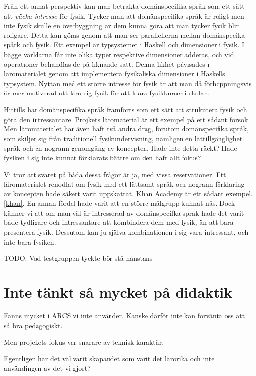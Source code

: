 \begin{binge}
Från ett annat perspektiv kan man betrakta domänspecifika språk som ett sätt att \textit{väcka intresse} för fysik. Tycker man att domänspecifika språk är roligt men inte fysik skulle en överbyggning av dem kunna göra att man tycker fysik blir roligare. Detta kan göras genom att man ser parallellerna mellan domänspecika spårk och fysik. Ett exempel är typsystemet i Haskell och dimensioner i fysik. I bägge världarna får inte olika typer respektive dimensioner adderas, och vid operationer behandlas de på liknande sätt. Denna likhet påvisades i läromaterialet genom att implementera fysikaliska dimensioner i Haskells typsystem. Nyttan med ett större intresse för fysik är att man då förhoppningsvis är mer motiverad att lära sig fysik för att klara fysikkurser i skolan.

Hittills har domänspecifika språk framförts som ett sätt att strukutera fysik och göra den intressantare. Projkets läromaterial är ett exempel på ett sådant försök. Men läromaterialet har även haft två andra drag, förutom domänspecifika språk, som skiljer sig från traditionell fysikundervisning, nämligen en lättillgänglighet språk och en nogrann genomgång av koncepten. Hade inte detta räckt? Hade fysiken i sig inte kunnat förklarats bättre om den haft allt fokus?

Vi tror att svaret på båda dessa frågor är ja, med vissa reservationer. Ett läromaterialet renodlat om fysik med ett lättsamt språk och nogrann förklaring av koncepten hade säkert varit uppskattat. Khan Academy är ett sådant exempel.\ref{khan}. En annan fördel hade varit att en större målgrupp kunnat nås. Dock känner vi att om man väl är intresserad av domänspecifka språk hade det varit både tydligare och intressantare att kombindera dem med fysik, än att bara presentera fysik. Dessutom kan ju själva kombinationen i sig vara intressant, och inte bara fysiken.

TODO: Vad testgruppen tyckte bör stå nånstans

\section{Inte tänkt så mycket på didaktik}

Fanns mycket i ARCS vi inte använder. Kanske därför inte kan förvänta oss att så bra pedagogiskt.

Men projekets fokus var snarare av teknisk karaktär.

Egentligen har det väl varit skapandet som varit det lärorika och inte användingen av det vi gjort?


\end{binge}
